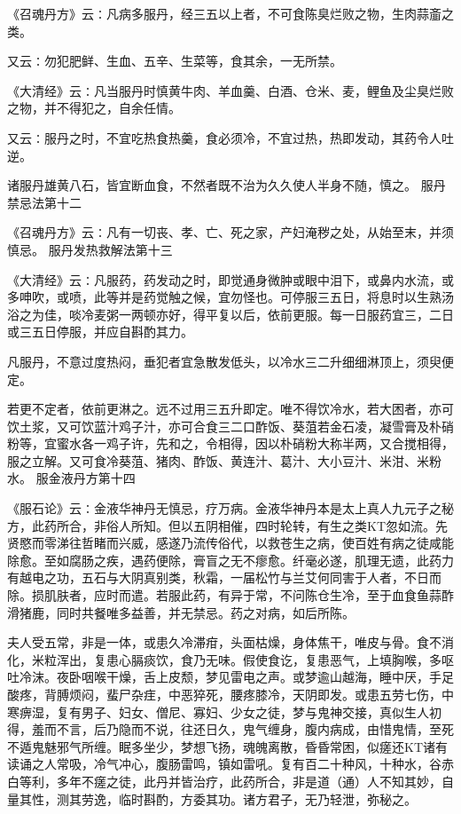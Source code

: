 \documentclass[a4paper,12pt,UTF8,twoside]{ctexbook}
\begin{document}
《召魂丹方》云∶凡病多服丹，经三五以上者，不可食陈臭烂败之物，生肉蒜齑之类。

又云∶勿犯肥鲜、生血、五辛、生菜等，食其余，一无所禁。

《大清经》云∶凡当服丹时慎黄牛肉、羊血羹、白酒、仓米、麦，鲤鱼及尘臭烂败之物，并不得犯之，自余任情。

又云∶服丹之时，不宜吃热食热羹，食必须冷，不宜过热，热即发动，其药令人吐逆。

诸服丹雄黄八石，皆宜断血食，不然者既不治为久久使人半身不随，慎之。
服丹禁忌法第十二

《召魂丹方》云∶凡有一切丧、孝、亡、死之家，产妇淹秽之处，从始至末，并须慎忌。
服丹发热救解法第十三

《大清经》云∶凡服药，药发动之时，即觉通身微肿或眼中泪下，或鼻内水流，或多呻吹，或喷，此等并是药觉触之候，宜勿怪也。可停服三五日，将息时以生熟汤浴之为佳，啖冷麦粥一两顿亦好，得平复以后，依前更服。每一日服药宜三，二日或三五日停服，并应自斟酌其力。

凡服丹，不意过度热闷，垂犯者宜急散发低头，以冷水三二升细细淋顶上，须臾便定。

若更不定者，依前更淋之。远不过用三五升即定。唯不得饮冷水，若大困者，亦可饮土浆，又可饮蓝汁鸡子汁，亦可合食三二口酢饭、葵菹若金石凌，凝雪膏及朴硝粉等，宜蜜水各一鸡子许，先和之，令相得，因以朴硝粉大称半两，又合搅相得，服之立解。又可食冷葵菹、猪肉、酢饭、黄连汁、葛汁、大小豆汁、米泔、米粉水。
服金液丹方第十四

《服石论》云∶金液华神丹无慎忌，疗万病。金液华神丹本是太上真人九元子之秘方，此药所合，非俗人所知。但以五阴相催，四时轮转，有生之类KT忽如流。先贤愍而零涕往哲睹而兴威，感遂乃流传俗代，以救苍生之病，使百姓有病之徒咸能除愈。至如腐肠之疾，遇药便除，膏盲之无不瘳愈。纤毫必遂，肌理无遗，此药力有越电之功，五石与大阴真别类，秋霜，一届松竹与兰艾何同害于人者，不日而除。损肌肤者，应时而遣。若服此药，有异于常，不问陈仓生冷，至于血食鱼蒜酢滑猪鹿，同时共餐唯多益善，并无禁忌。药之对病，如后所陈。

夫人受五常，非是一体，或患久冷滞疳，头面枯燥，身体焦干，唯皮与骨。食不消化，米粒浑出，复患心膈痰饮，食乃无味。假使食讫，复患恶气，上填胸喉，多呕吐冷沫。夜卧咽喉干燥，舌上皮颓，梦见雷电之声。或梦逾山越海，睡中厌，手足酸疼，背膊烦闷，蜚尸杂疰，中恶猝死，腰疼膝冷，天阴即发。或患五劳七伤，中寒痹湿，复有男子、妇女、僧尼、寡妇、少女之徒，梦与鬼神交接，真似生人初得，羞而不言，后乃隐而不说，往还日久，鬼气缠身，腹内病成，由惜鬼情，至死不遁鬼魅邪气所缠。眠多坐少，梦想飞扬，魂魄离散，昏昏常困，似瘥还KT诸有读诵之人常吸，冷气冲心，腹肠雷鸣，镇如雷吼。复有百二十种风，十种水，谷赤白等利，多年不瘥之徒，此丹并皆治疗，此药所合，非是道（通）人不知其妙，自量其性，测其劳逸，临时斟酌，方委其功。诸方君子，无乃轻泄，弥秘之。
\end{document}
